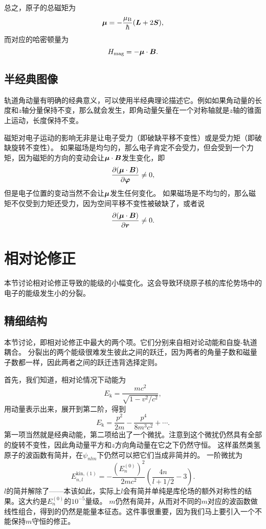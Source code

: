 总之，原子的总磁矩为
\begin{equation}
    {\vb*{\mu}} = - \frac{\mu_\text{B}}{\hbar} (\vb*{L} + 2\vb*{S}),
\end{equation}
而对应的哈密顿量为
\begin{equation}
    {H}_\text{mag} = - {\vb*{\mu}} \cdot \vb*{B}.
    \label{eq:magnetic-hamiltonian}
\end{equation}

\subsection{半经典图像}

轨道角动量有明确的经典意义，可以使用半经典理论描述它。例如如果角动量的长度和$z$轴分量保持不变，那么就会发生，即角动量矢量在一个对称轴就是$z$轴的锥面上运动，长度保持不变。

磁矩对电子运动的影响无非是让电子受力（即破缺平移不变性）或是受力矩（即破缺旋转不变性）。
如果磁场是均匀的，那么电子肯定不会受力，但会受到一个力矩，因为磁矩的方向的变动会让$\vb*{\mu} \cdot \vb*{B}$发生变化，即
\[
    \pdv{(\vb*{\mu} \cdot \vb*{B})}{\vb*{\varphi}} \neq 0,
\]
但是电子位置的变动当然不会让$\vb*{\mu}$发生任何变化。
如果磁场是不均匀的，那么磁矩不仅受到力矩还受力，因为空间平移不变性被破缺了，或者说
\[
    \pdv{(\vb*{\mu} \cdot \vb*{B})}{\vb*{r}} \neq 0.
\]

\section{相对论修正}

本节讨论相对论修正导致的能级的小幅变化。这会导致环绕原子核的库伦势场中的电子的能级发生小的分裂。

\subsection{精细结构}

本节讨论，即相对论修正中最大的两个项。它们分别来自相对论动能和自旋-轨道耦合。
分裂出的两个能级很难发生彼此之间的跃迁，因为两者的角量子数和磁量子数都一样，因此两者之间的跃迁违背选择定则。

首先，我们知道，相对论情况下动能为
\[
    E_\text{k} = \frac{m c^2}{\sqrt{1 - v^2 / c^2}},
\]
用动量表示出来，展开到第二阶，得到
\begin{equation}
    E_\text{k} = \frac{p^2}{2m} - \frac{p^4}{8 m^3 c^2} + \cdots.
\end{equation}
第一项当然就是经典动能，第二项给出了一个微扰。注意到这个微扰仍然具有全部的旋转不变性，因此角动量平方和$z$方向角动量在它之下仍然守恒。
这样虽然类氢原子的波函数有简并，在$\psi_{nlm}$下仍然可以把它们当成非简并的。
一阶微扰为
\begin{equation}
    E^{\text{kin},(1)}_{n, l} = - \frac{(E^{(0)}_n)^2}{2 m c^2} \left( \frac{4 n}{l + 1/2} - 3 \right).
    \label{eq:kinetic-energy-relativity-correction}
\end{equation}
$l$的简并解除了——本该如此，实际上$l$会有简并单纯是库伦场的额外对称性的结果。这大约是$E_n^{(0)}$的$10^{-5}$量级。
$m$仍然有简并，从而对不同的$m$对应的波函数做线性组合，得到的仍然是能量本征态。这件事很重要，因为我们马上要引入一个不能保持$m$守恒的修正。

